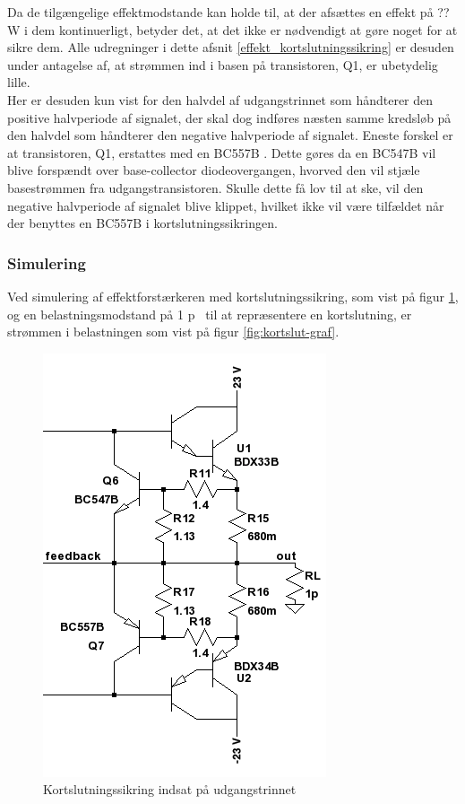 Da de tilgængelige effektmodstande kan holde til, at der afsættes en effekt på ?? W i dem kontinuerligt, betyder det, at det ikke er nødvendigt at gøre noget for at sikre dem. Alle udregninger i dette afsnit \ref{effekt_kortslutningssikring} er desuden under antagelse af, at strømmen ind i basen på transistoren, Q1, er ubetydelig lille.\\
Her er desuden kun vist for den halvdel af udgangstrinnet som håndterer den positive halvperiode af signalet, der skal dog indføres næsten samme kredsløb på den halvdel som håndterer den negative halvperiode af signalet. Eneste forskel er at transistoren, Q1, erstattes med en BC557B \cite{bc557b-datablad}. Dette gøres da en BC547B vil blive forspændt over base-collector diodeovergangen, hvorved den vil stjæle basestrømmen fra udgangstransistoren. Skulle dette få lov til at ske, vil den negative halvperiode af signalet blive klippet, hvilket ikke vil være tilfældet når der benyttes en BC557B i kortslutningssikringen. 

\subsubsection*{Simulering}

Ved simulering af effektforstærkeren med kortslutningssikring, som vist på figur \ref{fig:kortslut-done}, og en belastningsmodstand på 1 p\ohm~ til at repræsentere en kortslutning, er strømmen i belastningen som vist på figur \ref{fig:kortslut-graf}.

\begin{figure}[h]
\centering
\includegraphics[scale=0.5]{teknisk/effektforstaerker/kortslut-done.png}
\caption{Kortslutningssikring indsat på udgangstrinnet}
\label{fig:kortslut-done}
\end{figure}

